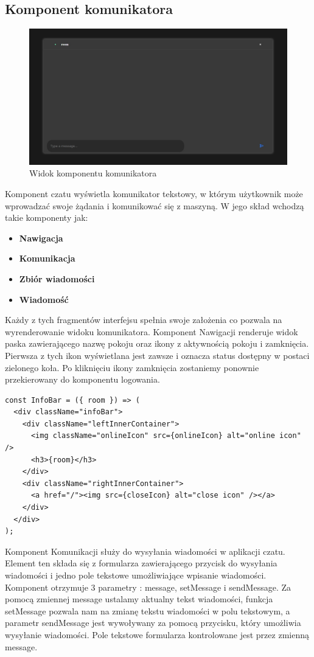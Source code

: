 \subsection{Komponent komunikatora}
\begin{figure}
	\centering
	\includegraphics[width=0.5\linewidth]{"obrazy/komunikator"}
	\caption{Widok komponentu komunikatora}
	\label{fig:9}
\end{figure} 
Komponent czatu wyświetla komunikator tekstowy, w którym użytkownik może wprowadzać swoje żądania i komunikować się z maszyną. W jego skład wchodzą takie komponenty jak: 
\begin{itemize}  
\item \textbf{ Nawigacja}
	\\
\item \textbf{ Komunikacja}
	\\
\item \textbf{ Zbiór wiadomości}
	\\
\item \textbf{ Wiadomość}
	\\
\end{itemize}
Każdy z tych fragmentów interfejsu spełnia swoje założenia co pozwala na wyrenderowanie widoku komunikatora. Komponent Nawigacji renderuje widok paska zawierającego nazwę pokoju oraz ikony z aktywnością pokoju i zamknięcia. Pierwsza z tych ikon wyświetlana jest zawsze i oznacza status dostępny w postaci zielonego koła. Po kliknięciu ikony zamknięcia zostaniemy ponownie przekierowany do komponentu logowania.
\begin{lstlisting}[caption=Implementacja komponentu nawigacji ]
const InfoBar = ({ room }) => (
  <div className="infoBar">
    <div className="leftInnerContainer">
      <img className="onlineIcon" src={onlineIcon} alt="online icon" />
      <h3>{room}</h3>
    </div>
    <div className="rightInnerContainer">
      <a href="/"><img src={closeIcon} alt="close icon" /></a>
    </div>
  </div>
);
\end{lstlisting}
Komponent Komunikacji służy do wysyłania wiadomości w aplikacji czatu. Element ten składa się z formularza zawierającego przycisk do wysyłania wiadomości i jedno pole tekstowe umożliwiające wpisanie wiadomości. Komponent otrzymuje 3 parametry : message, setMessage i sendMessage. Za pomocą zmiennej message ustalamy aktualny tekst wiadomości, funkcja setMessage pozwala nam na zmianę tekstu wiadomości w polu tekstowym, a parametr sendMessage jest wywoływany za pomocą przycisku, który umożliwia wysyłanie wiadomości. Pole tekstowe formularza kontrolowane jest przez zmienną message.

